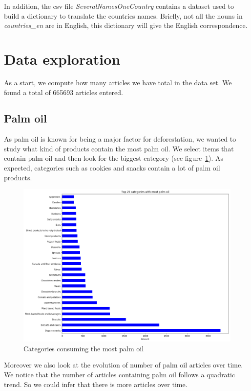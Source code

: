 \documentclass[11pt]{article}
\begin{document}
\noindent
In addition, the csv file \textit{SeveralNamesOneCountry} contains a dataset used to build a dictionary to translate the countries names. Briefly, not all the nouns in \textit{countries\_en} are in English, this dictionary will give the English correspondence.


\section{Data exploration}
As a start, we compute how many articles we have total in the data set. 
We found a total of 665693 articles entered. 
\subsection{Palm oil}
As palm oil is known for being a major factor for deforestation, we wanted to study what kind of products contain the most palm oil. We select items that contain palm oil and then look for the biggest category (see figure~\ref{fig:cat_palm_oil}). As expected, categories such as cookies and snacks contain a lot of palm oil products.
\begin{figure}
    \centering
    \includegraphics[scale=0.2]{figures/top_categories_palm_oil.png}
    \caption{Categories consuming the most palm oil}
    \label{fig:cat_palm_oil}
\end{figure}
\noindent
Moreover we also look at the evolution of number of palm oil articles over time. We notice that the number of articles containing palm oil follows a quadratic trend. So we could infer that there is more articles over time.
\end{document}
